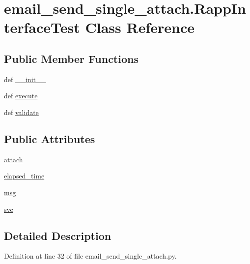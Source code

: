 \hypertarget{classemail__send__single__attach_1_1RappInterfaceTest}{\section{email\-\_\-send\-\_\-single\-\_\-attach.\-Rapp\-Interface\-Test Class Reference}
\label{classemail__send__single__attach_1_1RappInterfaceTest}
}
\subsection*{Public Member Functions}
\begin{DoxyCompactItemize}
\item 
def \hyperlink{classemail__send__single__attach_1_1RappInterfaceTest_aa581e5351849d7d0959cf9b1512e7cd1}{\-\_\-\-\_\-init\-\_\-\-\_\-}
\item 
def \hyperlink{classemail__send__single__attach_1_1RappInterfaceTest_a1348c0da3147b43de3d693812e83ecc3}{execute}
\item 
def \hyperlink{classemail__send__single__attach_1_1RappInterfaceTest_ad1e1f48bc708768229f87f1ff40ae6d3}{validate}
\end{DoxyCompactItemize}
\subsection*{Public Attributes}
\begin{DoxyCompactItemize}
\item 
\hyperlink{classemail__send__single__attach_1_1RappInterfaceTest_a7fcd75171867cccd04aa89f7a87d2a57}{attach}
\item 
\hyperlink{classemail__send__single__attach_1_1RappInterfaceTest_aa983be0a2cb68dd849f548c384614977}{elapsed\-\_\-time}
\item 
\hyperlink{classemail__send__single__attach_1_1RappInterfaceTest_adbb86d65e74f90fbfbc38f9dadc3be4c}{msg}
\item 
\hyperlink{classemail__send__single__attach_1_1RappInterfaceTest_a4cde5bd7f40144979c8606428c6b0ec1}{svc}
\end{DoxyCompactItemize}


\subsection{Detailed Description}


Definition at line 32 of file email\-\_\-send\-\_\-single\-\_\-attach.\-py.



